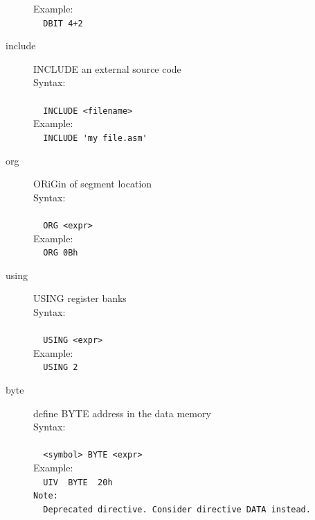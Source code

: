 \documentclass[a4paper,twoside,12pt]{book}
\begin{document}
\begin{description}
				Example:\\
				\verb'  '{\color{highlight_directive}\verb'DBIT'}\verb' '{\color{highlight_unknown_base}\verb'4'}{\color{highlight_symbol}\verb'+'}{\color{highlight_unknown_base}\verb'2'}\\
			\item[include] INCLUDE an external source code\\
				Syntax:\\\\
				\verb'  '{\color{highlight_directive}\verb'INCLUDE'}\verb' '{\color{highlight_string}\verb'<filename>'}\\
				Example:\\
				\verb'  '{\color{highlight_directive}\verb'INCLUDE'}\verb' '{\color{highlight_string}\verb''\verb"'"\verb'my file.asm'\verb"'"\verb''}\\
			\item[org] ORiGin of segment location\\
				Syntax:\\\\
				\verb'  '{\color{highlight_directive}\verb'ORG'}\verb' '{\color{highlight_symbol}\verb'<'}{\color{highlight_constant}\verb'expr'}{\color{highlight_symbol}\verb'>'}\\
				Example:\\
				\verb'  '{\color{highlight_directive}\verb'ORG'}\verb' '{\color{highlight_hex}\verb'0Bh'}\\
			\item[using] USING register banks\\
				Syntax:\\\\
				\verb'  '{\color{highlight_directive}\verb'USING'}\verb' '{\color{highlight_symbol}\verb'<'}{\color{highlight_constant}\verb'expr'}{\color{highlight_symbol}\verb'>'}\\
				Example:\\
				\verb'  '{\color{highlight_directive}\verb'USING'}\verb' '{\color{highlight_unknown_base}\verb'2'}\\
			\item[byte] define BYTE address in the data memory\\
				Syntax:\\\\
				\verb'  <symbol> '{\color{highlight_directive}\verb'BYTE'}\verb' '{\color{highlight_symbol}\verb'<'}{\color{highlight_constant}\verb'expr'}{\color{highlight_symbol}\verb'>'}\\
				Example:\\
				\verb'  UIV  '{\color{highlight_directive}\verb'BYTE'}\verb'  '{\color{highlight_hex}\verb'20h'}\\
				{\color{highlight_label}\verb'Note:'}\\
				\verb'  '{\color{highlight_macro}\verb'Deprecated'}\verb' '{\color{highlight_constant}\verb'directive. Consider directive DATA instead.'}\\
		\end{description}
		\onecolumn
\end{document}
